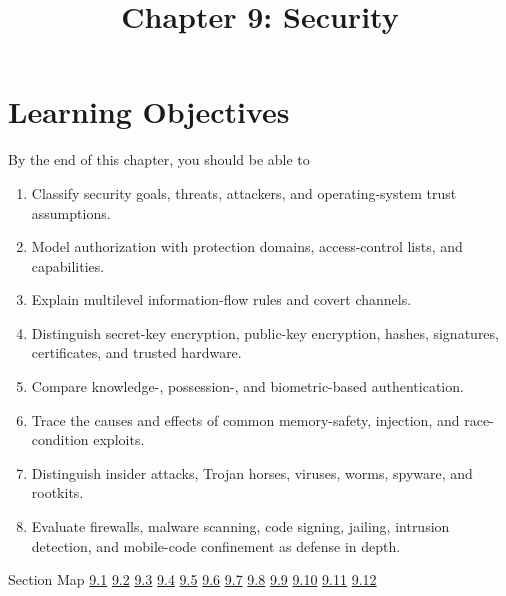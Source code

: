 \documentclass[10pt,letterpaper]{article}
\title{Chapter 9: Security}
\author{}
\date{}
\begin{document}
\maketitle
\section*{Learning Objectives}
\begin{studybox}{By the end of this chapter, you should be able to}
\begin{enumerate}
  \item Classify security goals, threats, attackers, and operating-system trust assumptions.
  \item Model authorization with protection domains, access-control lists, and capabilities.
  \item Explain multilevel information-flow rules and covert channels.
  \item Distinguish secret-key encryption, public-key encryption, hashes, signatures, certificates, and trusted hardware.
  \item Compare knowledge-, possession-, and biometric-based authentication.
  \item Trace the causes and effects of common memory-safety, injection, and race-condition exploits.
  \item Distinguish insider attacks, Trojan horses, viruses, worms, spyware, and rootkits.
  \item Evaluate firewalls, malware scanning, code signing, jailing, intrusion detection, and mobile-code confinement as defense in depth.
\end{enumerate}
\end{studybox}

\begin{studybox}{Section Map}
\hyperlink{sec-9-1}{9.1} \quad \hyperlink{sec-9-2}{9.2} \quad \hyperlink{sec-9-3}{9.3} \quad \hyperlink{sec-9-4}{9.4} \quad \hyperlink{sec-9-5}{9.5} \quad \hyperlink{sec-9-6}{9.6} \quad \hyperlink{sec-9-7}{9.7} \quad \hyperlink{sec-9-8}{9.8} \quad \hyperlink{sec-9-9}{9.9} \quad \hyperlink{sec-9-10}{9.10} \quad \hyperlink{sec-9-11}{9.11} \quad \hyperlink{sec-9-12}{9.12}
\end{studybox}
\end{document}
